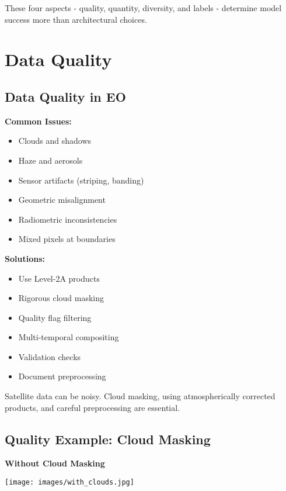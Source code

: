 \documentclass[
  letterpaper,
  DIV=11,
  numbers=noendperiod]{scrartcl}
\providecommand{\tightlist}{%
  \setlength{\itemsep}{0pt}\setlength{\parskip}{0pt}}
\begin{document}
These four aspects - quality, quantity, diversity, and labels -
determine model success more than architectural choices.

\section{Data Quality}\label{data-quality}

\subsection{Data Quality in EO}\label{data-quality-in-eo}

\textbf{Common Issues:}

\begin{itemize}
\tightlist
\item
  Clouds and shadows
\item
  Haze and aerosols
\item
  Sensor artifacts (striping, banding)
\item
  Geometric misalignment
\item
  Radiometric inconsistencies
\item
  Mixed pixels at boundaries
\end{itemize}

\textbf{Solutions:}

\begin{itemize}
\tightlist
\item
  Use Level-2A products
\item
  Rigorous cloud masking
\item
  Quality flag filtering
\item
  Multi-temporal compositing
\item
  Validation checks
\item
  Document preprocessing
\end{itemize}

Satellite data can be noisy. Cloud masking, using atmospherically
corrected products, and careful preprocessing are essential.

\subsection{Quality Example: Cloud
Masking}\label{quality-example-cloud-masking}

\textbf{Without Cloud Masking}

\texttt{[image: images/with\_clouds.jpg]}
\end{document}
